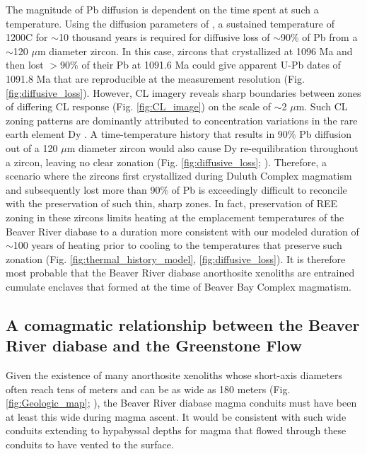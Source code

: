 The magnitude of Pb diffusion is dependent on the time spent at such a temperature. Using the diffusion parameters of , a sustained temperature of 1200\textdegree C for $\sim$10 thousand years is required for diffusive loss of $\sim$90\% of Pb from a $\sim$120 $\mu$m diameter zircon. In this case, zircons that crystallized at 1096 Ma and then lost $>$90\% of their Pb at 1091.6 Ma could give apparent U-Pb dates of 1091.8 Ma that are reproducible at the measurement resolution (Fig. \ref{fig:diffusive_loss}). However, CL imagery reveals sharp boundaries between zones of differing CL response (Fig. \ref{fig:CL_image}) on the scale of $\sim$2 $\mu$m. Such CL zoning patterns are dominantly attributed to concentration variations in the rare earth element Dy \cite{Remond1992a}. A time-temperature history that results in 90\% Pb diffusion out of a 120 $\mu$m diameter zircon would also cause Dy re-equilibration throughout a zircon, leaving no clear zonation (Fig. \ref{fig:diffusive_loss}; ). Therefore, a scenario where the zircons first crystallized during Duluth Complex magmatism and subsequently lost more than 90\% of Pb is exceedingly difficult to reconcile with the preservation of such thin, sharp zones. In fact, preservation of REE zoning in these zircons limits heating at the emplacement temperatures of the Beaver River diabase to a duration more consistent with our modeled duration of $\sim$100 years of heating prior to cooling to the temperatures that preserve such zonation (Fig. \ref{fig:thermal_history_model}, \ref{fig:diffusive_loss}). It is therefore most probable that the Beaver River diabase anorthosite xenoliths are entrained cumulate enclaves that formed at the time of Beaver Bay Complex magmatism. 

\subsection{A comagmatic relationship between the Beaver River diabase and the Greenstone Flow}

Given the existence of many anorthosite xenoliths whose short-axis diameters often reach tens of meters and can be as wide as 180 meters (Fig. \ref{fig:Geologic_map}; ), the Beaver River diabase magma conduits must have been at least this wide during magma ascent. It would be consistent with such wide conduits extending to hypabyssal depths for magma that flowed through these conduits to have vented to the surface.
 
